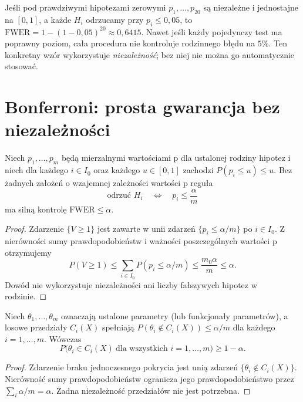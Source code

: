 \begin{przyklad}
Jeśli pod prawdziwymi hipotezami zerowymi
$p_1,\ldots,p_{20}$ są niezależne i jednostajne na
$[0,1]$, a każde $H_i$ odrzucamy przy $p_i\le0{,}05$,
to $\mathrm{FWER}=1-(1-0{,}05)^{20}\approx0{,}6415$.
Nawet jeśli każdy pojedynczy test ma poprawny poziom,
cała procedura nie kontroluje rodzinnego błędu na $5\%$.
Ten konkretny wzór wykorzystuje \emph{niezależność}; bez
niej nie można go automatycznie stosować.
\end{przyklad}

\section{Bonferroni: prosta gwarancja bez niezależności}
\begin{twierdzenie}\label{thm:bonferroni}
Niech $p_1,\ldots,p_m$ będą mierzalnymi wartościami p
dla ustalonej rodziny hipotez i niech dla każdego
$i\in I_0$ oraz każdego $u\in[0,1]$ zachodzi
$P(p_i\le u)\le u$. Bez żadnych założeń o wzajemnej
zależności wartości p reguła
\[
 \text{odrzuć }H_i\quad\Longleftrightarrow\quad
 p_i\le\frac\alpha m
\]
ma silną kontrolę $\mathrm{FWER}\le\alpha$.
\end{twierdzenie}
\begin{proof}
Zdarzenie $\{V\ge1\}$ jest zawarte w unii zdarzeń
$\{p_i\le\alpha/m\}$ po $i\in I_0$.
Z nierówności sumy prawdopodobieństw i ważności
poszczególnych wartości p otrzymujemy
\[
 P(V\ge1)\le\sum_{i\in I_0}P(p_i\le\alpha/m)
 \le\frac{m_0\alpha}m\le\alpha.
\]
Dowód nie wykorzystuje niezależności ani liczby fałszywych
hipotez w rodzinie.
\end{proof}

\begin{wniosek}
\label{cor:simultaneous-ci}
Niech $\theta_1,\ldots,\theta_m$ oznaczają ustalone
parametry (lub funkcjonały parametrów), a losowe
przedziały $C_i(X)$ spełniają
$P(\theta_i\notin C_i(X))\le\alpha/m$ dla każdego
$i=1,\ldots,m$. Wówczas
\[
 P\bigl(\theta_i\in C_i(X)\ \text{dla wszystkich }
 i=1,\ldots,m\bigr)\ge1-\alpha.
\]
\end{wniosek}
\begin{proof}
Zdarzenie braku jednoczesnego pokrycia jest unią zdarzeń
$\{\theta_i\notin C_i(X)\}$. Nierówność sumy
prawdopodobieństw ogranicza jego prawdopodobieństwo przez
$\sum_i\alpha/m=\alpha$. Żadna niezależność przedziałów
nie jest potrzebna.
\end{proof}

